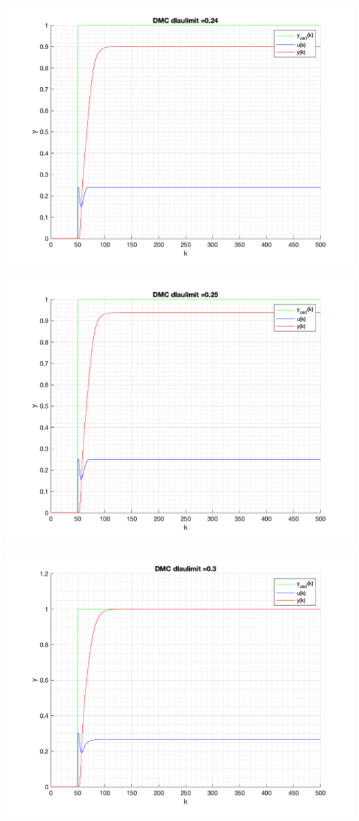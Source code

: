 \documentclass[a4paper, 11pt]{article}
\begin{document}
\begin{enumerate}
 \includegraphics[width=\linewidth]{./ModelsP6_ulimit/P4_DMC_ulimit_0_24_png.png} 
 
 \includegraphics[width=\linewidth]{./ModelsP6_ulimit/P4_DMC_ulimit_0_25_png.png} 
 
 \includegraphics[width=\linewidth]{./ModelsP6_ulimit/P4_DMC_ulimit_0_3_png.png} 
 

\end{enumerate}
\end{document}
